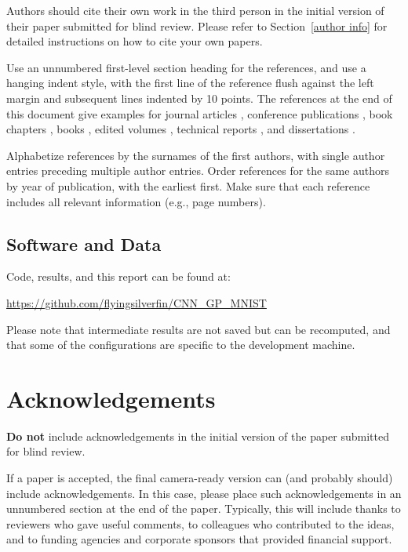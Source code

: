 \documentclass{article}
\begin{document}
Authors should cite their own work in the third person
in the initial version of their paper submitted for blind review.
Please refer to Section~\ref{author info} for detailed instructions on how to
cite your own papers.

Use an unnumbered first-level section heading for the references, and use a
hanging indent style, with the first line of the reference flush against the
left margin and subsequent lines indented by 10 points. The references at the
end of this document give examples for journal articles \cite{Samuel59},
conference publications \cite{langley00}, book chapters \cite{Newell81}, books
\cite{DudaHart2nd}, edited volumes \cite{MachineLearningI}, technical reports
\cite{mitchell80}, and dissertations \cite{kearns89}.

Alphabetize references by the surnames of the first authors, with
single author entries preceding multiple author entries. Order
references for the same authors by year of publication, with the
earliest first. Make sure that each reference includes all relevant
information (e.g., page numbers).


\subsection{Software and Data}

Code, results, and this report can be found at:

\url{https://github.com/flyingsilverfin/CNN_GP_MNIST}

Please note that intermediate results are not saved but can be recomputed, and that some of the configurations are specific to the development machine. %

\section*{Acknowledgements}

\textbf{Do not} include acknowledgements in the initial version of
the paper submitted for blind review.

If a paper is accepted, the final camera-ready version can (and
probably should) include acknowledgements. In this case, please
place such acknowledgements in an unnumbered section at the
end of the paper. Typically, this will include thanks to reviewers
who gave useful comments, to colleagues who contributed to the ideas,
and to funding agencies and corporate sponsors that provided financial
support.
\end{document}
